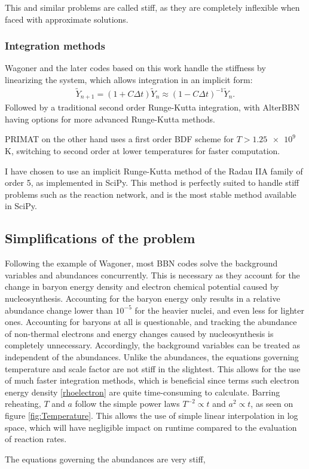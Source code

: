 This and similar problems are called stiff, as they are completely inflexible when faced with approximate solutions. 

\subsubsection{Integration methods}

Wagoner and the later codes based on this work handle the stiffness by linearizing the system, which allows integration in an implicit form:
\begin{align}
    \tilde{Y}_{n+1}=(1+C \Delta t)\tilde{Y}_{n}\approx(1-C \Delta t)^{-1}\tilde{Y}_{n}.
\end{align}
Followed by a traditional second order Runge-Kutta integration, with AlterBBN having options for more advanced Runge-Kutta methods. 

PRIMAT on the other hand uses a first order BDF scheme for $T>\num{1.25e9}$ K, switching to second order at lower temperatures for faster computation.

I have chosen to use an implicit Runge-Kutta method of the Radau IIA family of order 5, as implemented in SciPy. This method is perfectly suited to handle stiff problems such as the reaction network, and is the most stable method available in SciPy.

\subsection{Simplifications of the problem}
Following the example of Wagoner, most BBN codes solve the background variables and abundances concurrently. This is necessary as they account for the change in baryon energy density and electron chemical potential caused by nucleosynthesis. Accounting for the baryon energy only results in a relative abundance change lower than $10^{-5}$ for the heavier nuclei, and even less for lighter ones. Accounting for baryons at all is questionable, and tracking the abundance of non-thermal electrons and energy changes caused by nucleosynthesis is completely unnecessary. Accordingly, the background variables can be treated as independent of the abundances.
Unlike the abundances, the equations governing temperature and scale factor are not stiff in the slightest. This allows for the use of much faster integration methods, which is beneficial since terms such electron energy density \eqref{rhoelectron} are quite time-consuming to calculate. Barring reheating, $T$ and $a$ follow the simple power laws $T^{-2}\propto t$ and $a^2\propto t$, as seen on figure \ref{fig:Temperature}. This allows the use of simple linear interpolation in log space, which will have negligible impact on runtime compared to the evaluation of reaction rates.


The equations governing the abundances are very stiff, %